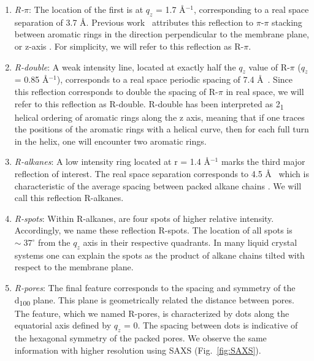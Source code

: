 \documentclass[journal=jpcbfk,manuscript=article]{achemso}
\begin{document}
  \begin{enumerate} 
  
	\item \textit{R-$\pi$}: The location of the first is at $q_z$ = 1.7
	\AA$^{-1}$, corresponding to a real space separation of 3.7 {\AA}. Previous
	work~\cite{feng_scalable_2014} attributes this reflection to $\pi$-$\pi$
	stacking between aromatic rings in the direction perpendicular to the membrane
	plane, or z-axis \cite{feng_scalable_2014}. For simplicity, we will refer to
	this reflection as R-$\pi$.
 
	\item \textit{R-double}: A weak intensity line, located at exactly half
	the $q_z$ value of R-$\pi$ ($q_z$ = 0.85 \AA$^{-1}$), corresponds to a real
	space periodic spacing of 7.4 \AA~. Since this reflection corresponds to double
	the spacing of R-$\pi$ in real space, we will refer to this reflection as R-double. 
	R-double has been interpreted as 2\textsubscript{1} helical ordering of aromatic
	rings along the z axis\cite{feng_scalable_2014}, meaning that if one traces the 
	positions of the aromatic rings with a helical curve, then for each full turn 
	in the helix, one will encounter two aromatic rings.

	\item \textit{R-alkanes}: A low intensity ring located at r = 1.4
	\AA$^{-1}$ marks the third major reflection of interest. The real space
	separation corresponds to 4.5 \AA~ which is characteristic of the average
	spacing between packed alkane chains \cite{mcintosh_organization_1980}. We will
	call this reflection R-alkanes.

	\item \textit{R-spots}: Within R-alkanes, are four spots of higher
	relative intensity.  Accordingly, we name these reflection R-spots. The
	location of all spots is $\sim\;37^{\circ}$ from the $q_z$ axis in their
	respective quadrants. In many liquid crystal systems one can explain the spots
	as the product of alkane chains tilted with respect to the membrane
	plane\cite{govind_simple_2001}.
 
	\item \textit{R-pores}: The final feature corresponds to the spacing
	and symmetry of the d\textsubscript{100} plane. This plane is geometrically
	related the distance between pores. The feature, which we named R-pores, is
	characterized by dots along the equatorial axis defined by $q_z$ = 0. The
	spacing between dots is indicative of the hexagonal symmetry of the packed
	pores. We observe the same information with higher resolution using SAXS
	(Fig.~\ref{fig:SAXS}). 

  \end{enumerate}
\end{document}
